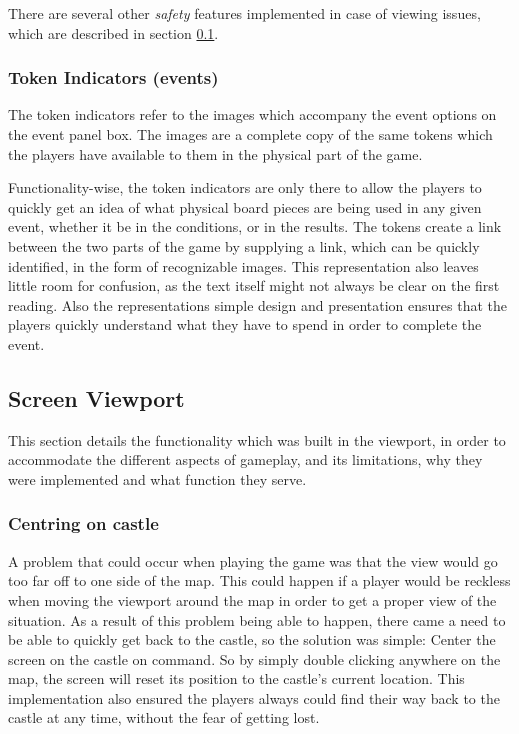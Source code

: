 There are several other \textit{safety} features implemented in case of viewing issues, which are described in section \ref{sec:cam}.

\subsubsection{Token Indicators (events)}
The token indicators refer to the images which accompany the event options on the event panel box. The images are a complete copy of the same tokens which the players have available to them in the physical part of the game. 

Functionality-wise, the token indicators are only there to allow the players to quickly get an idea of what physical board pieces are being used in any given event, whether it be in the conditions, or in the results. 
The tokens create a link between the two parts of the game by supplying a link, which can be quickly identified, in the form of recognizable images. 
This representation also leaves little room for confusion, as the text itself might not always be clear on the first reading. 
Also the representations simple design and presentation ensures that the players quickly understand what they have to spend in order to complete the event. 

\subsection{Screen Viewport}
\label{sec:cam}
This section details the functionality which was built in the viewport, in order to accommodate the different aspects of gameplay, and its limitations, why they were implemented and what function they serve.

\subsubsection{Centring on castle}
A problem that could occur when playing the game was that the view would go too far off to one side of the map. This could happen if a player would be reckless when moving the viewport around the map in order to get a proper view of the situation. As a result of this problem being able to happen, there came a need to be able to quickly get back to the castle, so the solution was simple: Center the screen on the castle on command. 
So by simply double clicking anywhere on the map, the screen will reset its position to the castle's current location. 
This implementation also ensured the players always could find their way back to the castle at any time, without the fear of getting lost.

